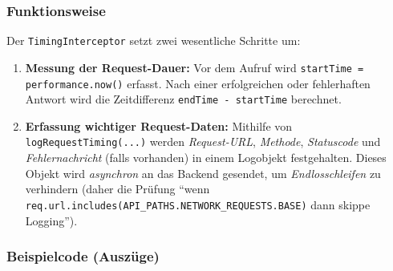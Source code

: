 \documentclass[12pt,oneside]{article}
\begin{document}
\subsubsection{Funktionsweise }
Der \lstinline|TimingInterceptor| setzt zwei wesentliche Schritte um:
\begin{enumerate}
  \item \textbf{Messung der Request-Dauer:} Vor dem Aufruf wird \lstinline|startTime = performance.now()| erfasst. Nach einer erfolgreichen oder fehlerhaften Antwort wird die Zeitdifferenz \lstinline|endTime - startTime| berechnet.
  \item \textbf{Erfassung wichtiger Request-Daten:} Mithilfe von \lstinline|logRequestTiming(...)| werden \emph{Request-URL}, \emph{Methode}, \emph{Statuscode} und \emph{Fehlernachricht} (falls vorhanden) in einem Logobjekt festgehalten. Dieses Objekt wird \emph{asynchron} an das Backend gesendet, um \emph{Endlosschleifen} zu verhindern (daher die Prüfung \enquote{wenn \lstinline|req.url.includes(API_PATHS.NETWORK_REQUESTS.BASE)| dann skippe Logging}).
\end{enumerate}

\subsubsection{Beispielcode (Auszüge)}
 
\end{document}
